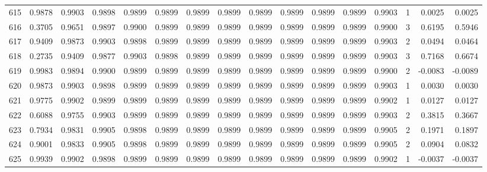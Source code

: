 \begin{tabular}{lrrrrrrrrrrrrrrr}
615 &      0.9878 &  0.9903 &  0.9898 &  0.9899 &  0.9899 &  0.9899 &  0.9899 &  0.9899 &  0.9899 &  0.9899 &   0.9899 &     0.9903 &      1 &                    0.0025 &                     0.0025 \\
616 &      0.3705 &  0.9651 &  0.9897 &  0.9900 &  0.9899 &  0.9899 &  0.9899 &  0.9899 &  0.9899 &  0.9899 &   0.9899 &     0.9900 &      3 &                    0.6195 &                     0.5946 \\
617 &      0.9409 &  0.9873 &  0.9903 &  0.9898 &  0.9899 &  0.9899 &  0.9899 &  0.9899 &  0.9899 &  0.9899 &   0.9899 &     0.9903 &      2 &                    0.0494 &                     0.0464 \\
618 &      0.2735 &  0.9409 &  0.9877 &  0.9903 &  0.9898 &  0.9899 &  0.9899 &  0.9899 &  0.9899 &  0.9899 &   0.9899 &     0.9903 &      3 &                    0.7168 &                     0.6674 \\
619 &      0.9983 &  0.9894 &  0.9900 &  0.9899 &  0.9899 &  0.9899 &  0.9899 &  0.9899 &  0.9899 &  0.9899 &   0.9899 &     0.9900 &      2 &                   -0.0083 &                    -0.0089 \\
620 &      0.9873 &  0.9903 &  0.9898 &  0.9899 &  0.9899 &  0.9899 &  0.9899 &  0.9899 &  0.9899 &  0.9899 &   0.9899 &     0.9903 &      1 &                    0.0030 &                     0.0030 \\
621 &      0.9775 &  0.9902 &  0.9899 &  0.9899 &  0.9899 &  0.9899 &  0.9899 &  0.9899 &  0.9899 &  0.9899 &   0.9899 &     0.9902 &      1 &                    0.0127 &                     0.0127 \\
622 &      0.6088 &  0.9755 &  0.9903 &  0.9899 &  0.9899 &  0.9899 &  0.9899 &  0.9899 &  0.9899 &  0.9899 &   0.9899 &     0.9903 &      2 &                    0.3815 &                     0.3667 \\
623 &      0.7934 &  0.9831 &  0.9905 &  0.9898 &  0.9899 &  0.9899 &  0.9899 &  0.9899 &  0.9899 &  0.9899 &   0.9899 &     0.9905 &      2 &                    0.1971 &                     0.1897 \\
624 &      0.9001 &  0.9833 &  0.9905 &  0.9898 &  0.9899 &  0.9899 &  0.9899 &  0.9899 &  0.9899 &  0.9899 &   0.9899 &     0.9905 &      2 &                    0.0904 &                     0.0832 \\
625 &      0.9939 &  0.9902 &  0.9898 &  0.9899 &  0.9899 &  0.9899 &  0.9899 &  0.9899 &  0.9899 &  0.9899 &   0.9899 &     0.9902 &      1 &                   -0.0037 &                    -0.0037 \\

\end{tabular}
